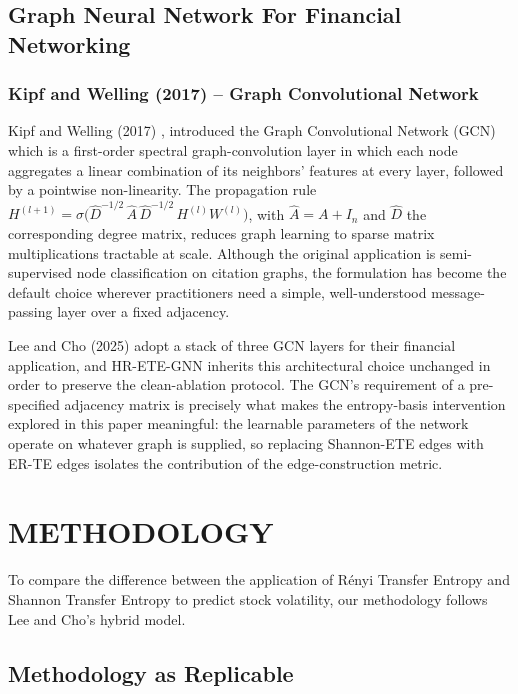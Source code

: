 \documentclass[12pt,oneside]{report}
\begin{document}
\section{Graph Neural Network For Financial Networking}

\subsection{Kipf and Welling (2017) -- Graph Convolutional Network}

Kipf and Welling (2017) \cite{kipf2017}, introduced the Graph
Convolutional Network (GCN) which is a first-order spectral
graph-convolution layer in which each node aggregates a linear
combination of its neighbors' features at every layer, followed by a
pointwise non-linearity. The propagation rule
$H^{(l+1)} = \sigma\bigl(\widehat{D}^{-1/2}\,\widehat{A}\,\widehat{D}^{-1/2}\,H^{(l)} W^{(l)}\bigr)$,
with $\widehat{A} = A + I_{n}$ and $\widehat{D}$ the corresponding
degree matrix, reduces graph learning to sparse matrix multiplications
tractable at scale. Although the original application is semi-supervised
node classification on citation graphs, the formulation has become the
default choice wherever practitioners need a simple, well-understood
message-passing layer over a fixed adjacency.

Lee and Cho (2025) \cite{lee2025} adopt a stack of three GCN layers for
their financial application, and HR-ETE-GNN inherits this architectural
choice unchanged in order to preserve the clean-ablation protocol. The
GCN's requirement of a pre-specified adjacency matrix is precisely what
makes the entropy-basis intervention explored in this paper meaningful:
the learnable parameters of the network operate on whatever graph is
supplied, so replacing Shannon-ETE edges with ER-TE edges isolates the
contribution of the edge-construction metric.

\chapter{METHODOLOGY}\label{ch:method}

To compare the difference between the application of Rényi Transfer
Entropy and Shannon Transfer Entropy to predict stock volatility, our
methodology follows Lee and Cho's \cite{lee2025} hybrid model.

\section*{Methodology as Replicable}
\end{document}
